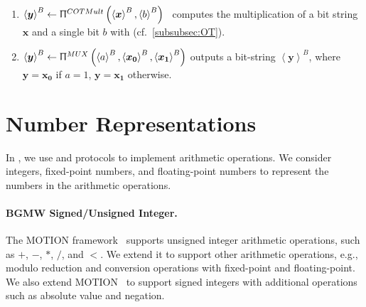 \begin{enumerate}
      \item $\left\langle \boldsymbol{y}\right\rangle^B \gets \Uppi^{COTMult}\left(\left\langle \boldsymbol{x}\right\rangle ^B,\left\langle b\right\rangle ^B\right) $~\cite{asharov2018privacy,schneider2019episode} computes the multiplication of a bit string $ \boldsymbol{x}$ and a single bit $ b$ with \correlatedot (cf.~\autoref{subsubsec:OT}).

      \item $\left\langle \boldsymbol{y}\right\rangle ^B \gets  \Uppi^{MUX}\left(\left\langle a\right\rangle^B, \left\langle \boldsymbol{x_0}\right\rangle^B ,\left\langle \boldsymbol{x_1}\right\rangle^B  \right) $ outputs a bit-string $\left\langle \boldsymbol{y}\right\rangle^{B} $, where $ \boldsymbol{y}=\boldsymbol{x_0} $ if $a=1$, $\boldsymbol{y}=\boldsymbol{x_1} $ otherwise.

\end{enumerate}

\section{Number Representations}
\label{sec:NumberRepresentationsandArithmeticOperations}
In \smpc, we use \booleanGMW and \arithmeticGMW protocols to implement arithmetic operations. We consider integers, fixed-point numbers, and floating-point numbers to represent the numbers in the arithmetic operations.


\paragraph{BGMW Signed/Unsigned Integer.}
The MOTION framework~\cite{braun2022motion} supports \booleanGMW unsigned integer arithmetic operations, such as $+$, $-$, $*$, $/$, and $<$. We extend it to support other arithmetic operations, e.g., modulo reduction and conversion operations with \booleanGMW fixed-point and \booleanGMW floating-point.
We also extend MOTION~\cite{braun2022motion} to support \booleanGMW signed integers with additional operations such as absolute value and negation.

